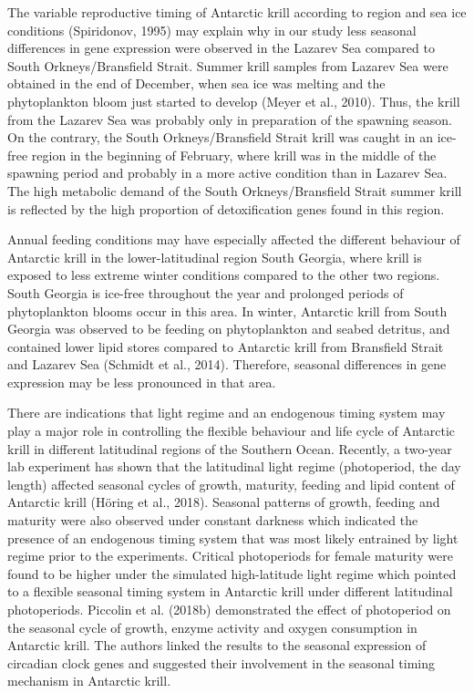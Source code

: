 The variable reproductive timing of Antarctic krill according to region and sea ice conditions (Spiridonov, 1995) may explain why in our study less seasonal differences in gene expression were observed in the Lazarev Sea compared to South Orkneys/Bransfield Strait. Summer krill samples from Lazarev Sea were obtained in the end of December, when sea ice was melting and the phytoplankton bloom just started to develop (Meyer et al., 2010). Thus, the krill from the Lazarev Sea was probably only in preparation of the spawning season. On the contrary, the South Orkneys/Bransfield Strait krill was caught in an ice-free region in the beginning of February, where krill was in the middle of the spawning period and probably in a more active condition than in Lazarev Sea. The high metabolic demand of the South Orkneys/Bransfield Strait summer krill is reflected by the high proportion of detoxification genes found in this region.

Annual feeding conditions may have especially affected the different behaviour of Antarctic krill in the lower-latitudinal region South Georgia, where krill is exposed to less extreme winter conditions compared to the other two regions. South Georgia is ice-free throughout the year and prolonged periods of phytoplankton blooms occur in this area. In winter, Antarctic krill from South Georgia was observed to be feeding on phytoplankton and seabed detritus, and contained lower lipid stores compared to Antarctic krill from Bransfield Strait and Lazarev Sea (Schmidt et al., 2014). Therefore, seasonal differences in gene expression may be less pronounced in that area.

There are indications that light regime and an endogenous timing system may play a major role in controlling the flexible behaviour and life cycle of Antarctic krill in different latitudinal regions of the Southern Ocean. Recently, a two-year lab experiment has shown that the latitudinal light regime (photoperiod, the day length) affected seasonal cycles of growth, maturity, feeding and lipid content of Antarctic krill (Höring et al., 2018). Seasonal patterns of growth, feeding and maturity were also observed under constant darkness which indicated the presence of an endogenous timing system that was most likely entrained by light regime prior to the experiments. Critical photoperiods for female maturity were found to be higher under the simulated high-latitude light regime which pointed to a flexible seasonal timing system in Antarctic krill under different latitudinal photoperiods. Piccolin et al. (2018b) demonstrated the effect of photoperiod on the seasonal cycle of growth, enzyme activity and oxygen consumption in Antarctic krill. The authors linked the results to the seasonal expression of circadian clock genes and suggested their involvement in the seasonal timing mechanism in Antarctic krill.

